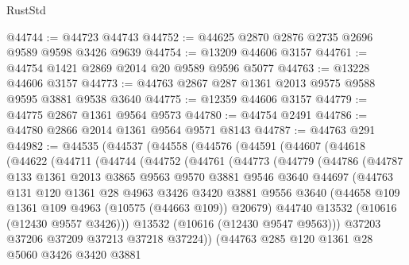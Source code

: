 \begin{lexlean}{RustStd}
\begin{coremodule}
@44744 := @44723 @44743
@44752 := @44625 @2870 @2876 @2735 @2696 @9589 @9598 @3426 @9639
@44754 := @13209 @44606 @3157
@44761 := @44754 @1421 @2869 @2014 @20 @9589 @9596 @5077
@44763 := @13228 @44606 @3157
@44773 := @44763 @2867 @287 @1361 @2013 @9575 @9588 @9595 @3881 @9538 @3640
@44775 := @12359 @44606 @3157
@44779 := @44775 @2867 @1361 @9564 @9573
@44780 := @44754 @2491
@44786 := @44780 @2866 @2014 @1361 @9564 @9571 @8143
@44787 := @44763 @291
@44982 := @44535
    (@44537
      (@44558
        (@44576
          (@44591
            (@44607
              (@44618
                (@44622
                  (@44711
                    (@44744
                      (@44752
                        (@44761
                          (@44773
                            (@44779
                              (@44786
                                (@44787
                                  @133
                                  @1361
                                  @2013
                                  @3865
                                  @9563
                                  @9570
                                  @3881
                                  @9546
                                  @3640
                                  @44697
                                  (@44763
                                    @131
                                    @120
                                    @1361
                                    @28
                                    @4963
                                    @3426
                                    @3420
                                    @3881
                                    @9556
                                    @3640
                                    (@44658 @109 @1361 @109 @4963 (@10575 (@44663 @109)) @20679)
                                    @44740
                                    @13532
                                    (@10616 (@12430 @9557 @3426)))
                                  @13532
                                  (@10616 (@12430 @9547 @9563)))
                                @37203
                                @37206
                                @37209
                                @37213
                                @37218
                                @37224))
                            (@44763
                              @285
                              @120
                              @1361
                              @28
                              @5060
                              @3426
                              @3420
                              @3881

\end{coremodule}
\end{lexlean}
